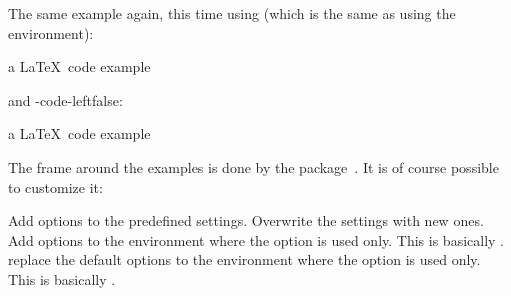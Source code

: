 \documentclass[load-preamble+,babel-options={ngerman,english}]{cnltx-doc}
\begin{document}
The same example again, this time using   (which is the
same as using the  environment):

\begin{example}
  a \LaTeX\ code example
\end{example}

 and \keyis-{code-left}{false}:

\begin{example}[side-by-side,code-left=false]
  a \LaTeX\ code example
\end{example}

The frame around the examples is done by the
 package~\cite{pkg:mdframed}.  It is of course possible to
customize it:
\begin{options}
  \Default
    Add options to the predefined settings.
    Overwrite the settings with new ones.
    Add  options to the environment where the
    option is used only.  This is
    basically \beginenv*{}.
    replace the default  options to the
    environment where the option is used only.  This is
    basically \beginenv*{}.
\end{options}
\end{document}
